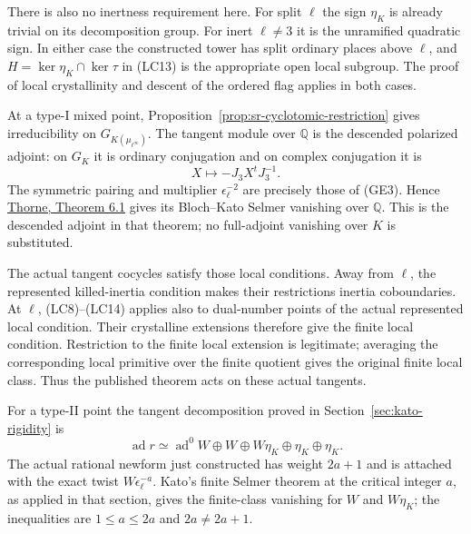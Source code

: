 There is also no inertness requirement here.
For split \(\ell\) the sign \(\eta_K\)
is already trivial on its decomposition group.
For inert \(\ell\ne3\) it is the unramified
quadratic sign. In either case the constructed
tower has split ordinary places above \(\ell\),
and \(H=\ker\eta_K\cap\ker\tau\) in (LC13)
is the appropriate open local subgroup.
The proof of local crystallinity and descent
of the ordered flag applies in both cases.

At a type-I mixed point,
Proposition~\ref{prop:sr-cyclotomic-restriction}
gives irreducibility on
\(G_{K(\mu_{\ell^\infty})}\).
The tangent module over \(\mathbb Q\) is
the descended polarized adjoint:
on \(G_K\) it is ordinary conjugation and
on complex conjugation it is
\[
                         X\longmapsto-J_3X^tJ_3^{-1}.
\]
The symmetric pairing and multiplier
\(\epsilon_\ell^{-2}\) are precisely those
of (GE3). Hence
\href{https://arxiv.org/pdf/2207.04925}
{Thorne, Theorem 6.1} gives its
Bloch--Kato Selmer vanishing over \(\mathbb Q\).
This is the descended adjoint in that theorem;
no full-adjoint vanishing over \(K\) is substituted.

The actual tangent cocycles satisfy those
local conditions.
Away from \(\ell\), the represented killed-inertia
condition makes their restrictions inertia
coboundaries. At \(\ell\), (LC8)--(LC14)
applies also to dual-number points of the
actual represented local condition.
Their crystalline extensions therefore give
the finite local condition.
Restriction to the finite local extension is
legitimate; averaging the corresponding local
primitive over the finite quotient gives the
original finite local class.
Thus the published theorem acts on these
actual tangents.

For a type-II point the tangent decomposition
proved in Section~\ref{sec:kato-rigidity} is
\[
 \operatorname{ad}r\simeq
    \operatorname{ad}^0W\oplus W\oplus W\eta_K
                         \oplus\eta_K\oplus\eta_K .
 \tag{GC4}
\]
The actual rational newform just constructed
has weight \(2a+1\) and is attached with the
exact twist \(W\epsilon_\ell^{-a}\).
Kato's finite Selmer theorem at the critical
integer \(a\), as applied in that section,
gives the finite-class vanishing for \(W\)
and \(W\eta_K\); the inequalities are
\(1\le a\le2a\) and \(2a\ne2a+1\).

